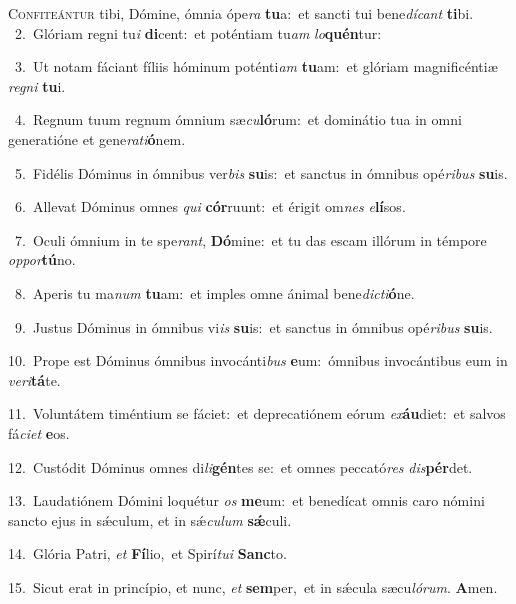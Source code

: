 \lettrine{\initial\textcolor{\initialcolor}{C}}{onfiteántur} tibi, Dómine, ómnia ópe\textit{ra} \textbf{tu}\-a:~\star et sancti tui bene\-\textit{dí}\-\textit{cant} \textbf{ti}\-bi.\\
{\numbfont\textcolor{\numbcolor}{~2.}}~Glóriam regni tu\textit{i} \textbf{di}\-cent:~\star et poténtiam tu\textit{am} \textit{lo}\-\textbf{quén}tur:\par
{\numbfont\textcolor{\numbcolor}{~3.}}~Ut notam fáciant fíliis hóminum poténti\textit{am} \textbf{tu}\-am:~\star et glóriam magnificéntiæ \textit{re}\-\textit{gni} \textbf{tu}\-i.\par
{\numbfont\textcolor{\numbcolor}{~4.}}~Regnum tuum regnum ómnium sæ\-\textit{cu}\-\textbf{ló}rum:~\star et dominátio tua in omni generatióne et gene\-\textit{ra}\-\textit{ti}\textbf{ó}nem.\par
{\numbfont\textcolor{\numbcolor}{~5.}}~Fidélis Dóminus in ómnibus ver\textit{bis} \textbf{su}\-is:~\star et sanctus in ómnibus opé\-\textit{ri}\-\textit{bus} \textbf{su}\-is.\par
{\numbfont\textcolor{\numbcolor}{~6.}}~Allevat Dóminus omnes \textit{qui} \textbf{cór}\-ruunt:~\star et érigit om\textit{nes} \textit{e}\-\textbf{lí}sos.\par
{\numbfont\textcolor{\numbcolor}{~7.}}~Oculi ómnium in te spe\-\textit{rant}\-, \textbf{Dó}\-mine:~\star et tu das escam illórum in témpore \textit{op}\-\textit{por}\textbf{tú}no.\par
{\numbfont\textcolor{\numbcolor}{~8.}}~Aperis tu ma\textit{num} \textbf{tu}\-am:~\star et imples omne ánimal bene\-\textit{dic}\-\textit{ti}\textbf{ó}ne.\par
{\numbfont\textcolor{\numbcolor}{~9.}}~Justus Dóminus in ómnibus vi\textit{is} \textbf{su}\-is:~\star et sanctus in ómnibus opé\-\textit{ri}\-\textit{bus} \textbf{su}\-is.\par
{\numbfont\textcolor{\numbcolor}{10.}}~Prope est Dóminus ómnibus invocánti\textit{bus} \textbf{e}\-um:~\star ómnibus invocántibus eum in \textit{ve}\-\textit{ri}\textbf{tá}te.\par
{\numbfont\textcolor{\numbcolor}{11.}}~Voluntátem timéntium se fáciet:~\dagger et deprecatiónem eórum \textit{ex}\-\textbf{áu}diet:~\star et salvos fá\-\textit{ci}\-\textit{et} \textbf{e}\-os.\par
{\numbfont\textcolor{\numbcolor}{12.}}~Custódit Dóminus omnes di\-\textit{li}\-\textbf{gén}tes se:~\star et omnes peccató\textit{res} \textit{dis}\-\textbf{pér}det.\par
{\numbfont\textcolor{\numbcolor}{13.}}~Laudatiónem Dómini loquétur \textit{os} \textbf{me}\-um:~\star et benedícat omnis caro nómini sancto ejus in sǽculum, et in sǽ\-\textit{cu}\-\textit{lum} \textbf{sǽ}\-culi.\par
{\numbfont\textcolor{\numbcolor}{14.}}~Glória Patri, \textit{et} \textbf{Fí}\-lio,~\star et Spirí\-\textit{tu}\-\textit{i} \textbf{Sanc}\-to.\par
{\numbfont\textcolor{\numbcolor}{15.}}~Sicut erat in princípio, et nunc, \textit{et} \textbf{sem}\-per,~\star et in sǽcula sæcu\-\textit{ló}\-\textit{rum}. \textbf{A}\-men.\par
